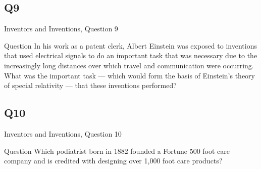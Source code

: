 \documentclass[11pt]{beamer}
\begin{document}
\subsection*{Q9}
\begin{frame}[t]{Inventors and Inventions, Question 9}
\begin{block}{Question}
In his work as a patent clerk, Albert Einstein was exposed to inventions that used electrical signals to do an important task that was necessary due to the increasingly long distances over which travel and communication were occurring. What was the important task --- which would form the basis of Einstein's theory of special relativity --- that these inventions performed?
\end{block}
\end{frame}
\subsection*{Q10}
\begin{frame}[t]{Inventors and Inventions, Question 10}
\begin{block}{Question}
Which podiatrist born in 1882 founded a Fortune 500 foot care company and is credited with designing over 1,000 foot care products?
\end{block}
\end{frame}
\end{document}
